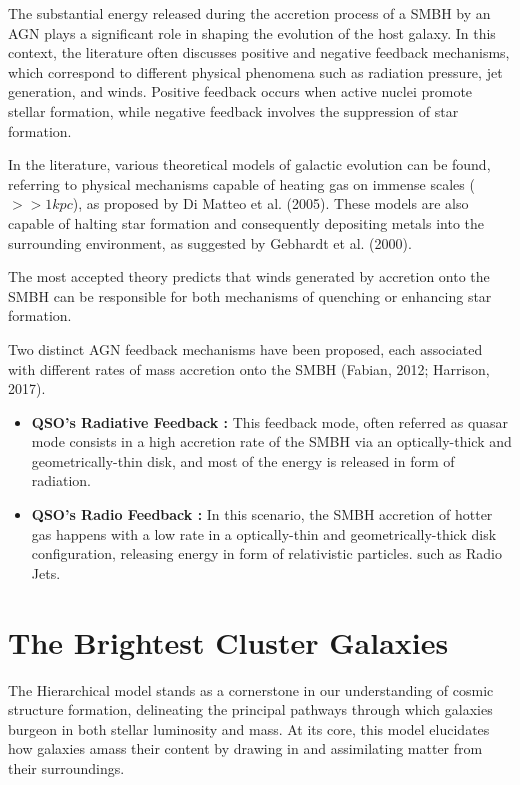 The substantial energy released during the accretion process of a SMBH by an AGN plays a significant role in shaping the evolution of the host galaxy. In this context, the literature often discusses positive and negative feedback mechanisms, which correspond to different physical phenomena such as radiation pressure, jet generation, and winds. Positive feedback occurs when active nuclei promote stellar formation, while negative feedback involves the suppression of star formation.

In the literature, various theoretical models of galactic evolution can be found, referring to physical mechanisms capable of heating gas on immense scales ($>> 1 kpc$), as proposed by Di Matteo et al. (2005). These models are also capable of halting star formation and consequently depositing metals into the surrounding environment, as suggested by Gebhardt et al. (2000).

The most accepted theory predicts that winds generated by accretion onto the SMBH can be responsible for both mechanisms of quenching or enhancing star formation.

Two distinct AGN feedback mechanisms have been proposed, each associated with different rates of mass accretion onto the SMBH (Fabian, 2012; Harrison, 2017).
\begin{itemize}
	\item \textbf{QSO's Radiative Feedback :} This feedback mode, often referred as quasar mode consists in a high accretion 		rate of the SMBH via an optically-thick and geometrically-thin disk, and most of the energy is released in form of radiation.
	\item \textbf{QSO's Radio Feedback :} In this scenario, the SMBH accretion of hotter gas happens with a low rate in a optically-thin and geometrically-thick disk configuration, releasing energy in form of relativistic particles. such as Radio Jets.
\end{itemize}




\section{The Brightest Cluster Galaxies }
The Hierarchical model stands as a cornerstone in our understanding of cosmic structure formation, delineating the principal pathways through which galaxies burgeon in both stellar luminosity and mass. At its core, this model elucidates how galaxies amass their content by drawing in and assimilating matter from their surroundings.

